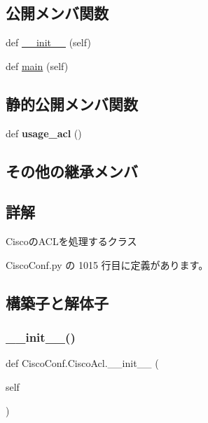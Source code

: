 \subsection*{公開メンバ関数}
\begin{DoxyCompactItemize}
\item 
def \mbox{\hyperlink{classCiscoConf_1_1CiscoAcl_a84104a6a25dd68d24474d15985702ab6}{\+\_\+\+\_\+init\+\_\+\+\_\+}} (self)
\item 
def \mbox{\hyperlink{classCiscoConf_1_1CiscoAcl_a3865990e7ffb488c97717b01f8a37fb8}{main}} (self)
\end{DoxyCompactItemize}
\subsection*{静的公開メンバ関数}
\begin{DoxyCompactItemize}
\item 
\mbox{\label{classCiscoConf_1_1CiscoAcl_a7653afce2d1d822a281ffec5bd3ca25c}} 
def {\bfseries usage\+\_\+acl} ()
\end{DoxyCompactItemize}
\subsection*{その他の継承メンバ}


\subsection{詳解}
\begin{DoxyVerb}CiscoのACLを処理するクラス
\end{DoxyVerb}
 

 Cisco\+Conf.\+py の 1015 行目に定義があります。



\subsection{構築子と解体子}
\mbox{\label{classCiscoConf_1_1CiscoAcl_a84104a6a25dd68d24474d15985702ab6}} 
\subsubsection{\texorpdfstring{\_\_init\_\_()}{\_\_init\_\_()}}
{\footnotesize\ttfamily def Cisco\+Conf.\+Cisco\+Acl.\+\_\+\+\_\+init\+\_\+\+\_\+ (\begin{DoxyParamCaption}\item[{}]{self }\end{DoxyParamCaption})}

